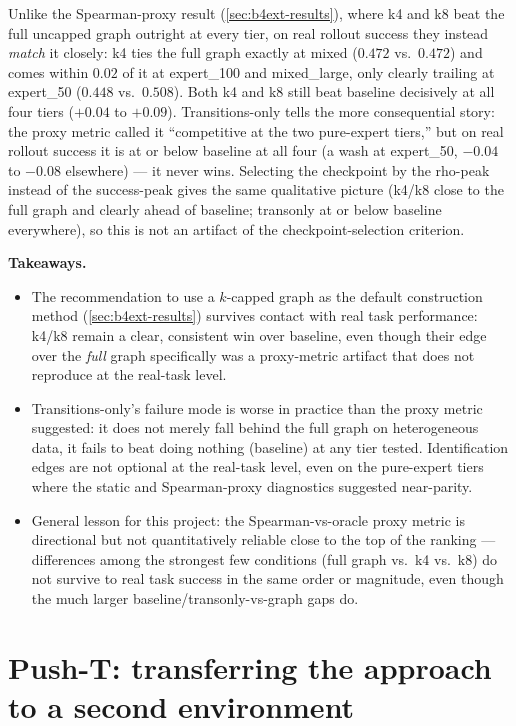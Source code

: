 \documentclass[11pt]{article}
\begin{document}
Unlike the Spearman-proxy result (\cref{sec:b4ext-results}), where k4 and k8 beat the full
uncapped graph outright at every tier, on real rollout success they instead \emph{match} it
closely: k4 ties the full graph exactly at mixed ($0.472$ vs.\ $0.472$) and comes within $0.02$ of
it at expert\_100 and mixed\_large, only clearly trailing at expert\_50 ($0.448$ vs.\ $0.508$).
Both k4 and k8 still beat baseline decisively at all four tiers ($+0.04$ to $+0.09$).
Transitions-only tells the more consequential story: the proxy metric called it ``competitive at
the two pure-expert tiers,'' but on real rollout success it is at or below baseline at all four
(a wash at expert\_50, $-0.04$ to $-0.08$ elsewhere) --- it never wins. Selecting the checkpoint by
the rho-peak instead of the success-peak gives the same qualitative picture (k4/k8 close to the
full graph and clearly ahead of baseline; transonly at or below baseline everywhere), so this is
not an artifact of the checkpoint-selection criterion.

\textbf{Takeaways.}
\begin{itemize}[leftmargin=1.4em,itemsep=2pt]
\item The recommendation to use a $k$-capped graph as the default construction method
(\cref{sec:b4ext-results}) survives contact with real task performance: k4/k8 remain a clear,
consistent win over baseline, even though their edge over the \emph{full} graph specifically was a
proxy-metric artifact that does not reproduce at the real-task level.
\item Transitions-only's failure mode is worse in practice than the proxy metric suggested: it
does not merely fall behind the full graph on heterogeneous data, it fails to beat doing nothing
(baseline) at any tier tested. Identification edges are not optional at the real-task level, even
on the pure-expert tiers where the static and Spearman-proxy diagnostics suggested near-parity.
\item General lesson for this project: the Spearman-vs-oracle proxy metric is directional but not
quantitatively reliable close to the top of the ranking --- differences among the strongest few
conditions (full graph vs.\ k4 vs.\ k8) do not survive to real task success in the same order or
magnitude, even though the much larger baseline/transonly-vs-graph gaps do.
\end{itemize}

\section{Push-T: transferring the approach to a second environment}
\label{sec:pusht}
\end{document}
